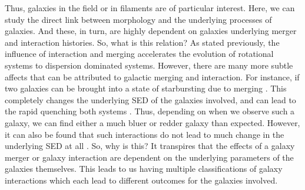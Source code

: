 Thus, galaxies in the field or in filaments are of particular interest. Here, we can study the direct link between morphology and the underlying processes of galaxies. And these, in turn, are highly dependent on galaxies underlying merger and interaction histories. So, what is this relation? As stated previously, the influence of interaction and merging accelerates the evolution of rotational systems to dispersion dominated systems. However, there are many more subtle affects that can be attributed to galactic merging and interaction. For instance, if two galaxies can be brought into a state of starbursting due to merging \citep{Paper on starbursting galaxies in interaction.}. This completely changes the underlying SED of the galaxies involved, and can lead to the rapid quenching both systems \citep{Paper on quenching a galaxy with interaction}. Thus, depending on when we observe such a galaxy, we can find either a much bluer or redder galaxy than expected. However, it can also be found that such interactions do not lead to much change in the underlying SED at all \citep{Paper on not much change in the SED of a galaxy}. So, why is this? It transpires that the effects of a galaxy merger or galaxy interaction are dependent on the underlying parameters of the galaxies themselves. This leads to us having multiple classifications of galaxy interactions which each lead to different outcomes for the galaxies involved. 

